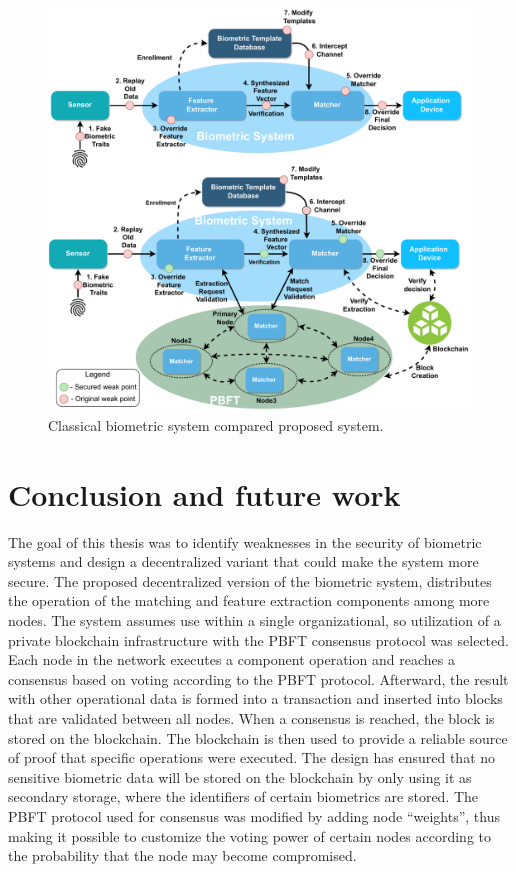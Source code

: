 \begin{figure}[h]
	\centering
	\includegraphics[width=\linewidth]{obrazky-figures/BiometricSystemComparisonWithOurDesign.pdf}
	\caption{Classical biometric system compared proposed system.}
	\label{ComparisonOfSystems}
\end{figure}

\chapter{Conclusion and future work}
The goal of this thesis was to identify weaknesses in the security of biometric systems and design a decentralized variant that could make the system more secure. The proposed decentralized version of the biometric system, distributes the operation of the matching and feature extraction components among more nodes. The system assumes use within a single organizational, so utilization of a private blockchain infrastructure with the PBFT consensus protocol was selected. Each node in the network executes a component operation and reaches a consensus based on voting according to the PBFT protocol. Afterward, the result with other operational data is formed into a transaction and inserted into blocks that are validated between all nodes. When a consensus is reached, the block is stored on the blockchain. The blockchain is then used to provide a reliable source of proof that specific operations were executed. The design has ensured that no sensitive biometric data will be stored on the blockchain by only using it as secondary storage, where the identifiers of certain biometrics are stored. The PBFT protocol used for consensus was modified by adding node ``weights'', thus making it possible to customize the voting power of certain nodes according to the probability that the node may become compromised. 

